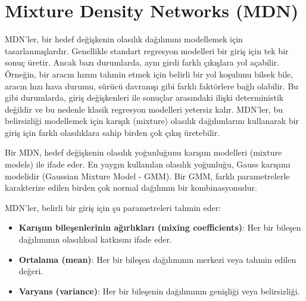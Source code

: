 \section{Mixture Density Networks (MDN)}

MDN'ler, bir hedef değişkenin olasılık dağılımını modellemek için tasarlanmışlardır. Genellikle standart regresyon modelleri bir giriş için tek bir sonuç üretir. Ancak bazı durumlarda, aynı girdi farklı çıkışlara yol açabilir. Örneğin, bir aracın hızını tahmin etmek için belirli bir yol koşulunu bilsek bile, aracın hızı hava durumu, sürücü davranışı gibi farklı faktörlere bağlı olabilir. Bu gibi durumlarda, giriş değişkenleri ile sonuçlar arasındaki ilişki deterministik değildir ve bu nedenle klasik regresyon modelleri yetersiz kalır. MDN'ler, bu belirsizliği modellemek için karışık (mixture) olasılık dağılımlarını kullanarak bir giriş için farklı olasılıklara sahip birden çok çıkış üretebilir.

Bir MDN, hedef değişkenin olasılık yoğunluğunu karışım modelleri (mixture models) ile ifade eder. En yaygın kullanılan olasılık yoğunluğu, Gauss karışımı modelidir (Gaussian Mixture Model - GMM). Bir GMM, farklı parametrelerle karakterize edilen birden çok normal dağılımın bir kombinasyonudur.

MDN'ler, belirli bir giriş için şu parametreleri tahmin eder:

\begin{itemize}
    \item \textbf{Karışım bileşenlerinin ağırlıkları (mixing coefficients)}: Her bir bileşen dağılımının olasılıksal katkısını ifade eder.
    \item \textbf{Ortalama (mean)}: Her bir bileşen dağılımının merkezi veya tahmin edilen değeri.
    \item \textbf{Varyans (variance)}: Her bir bileşenin dağılımının genişliği veya belirsizliği.
\end{itemize}

\newpage